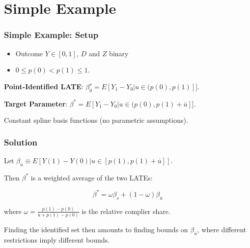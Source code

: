 \documentclass[11pt, aspectratio=169]{beamer}
\begin{document}
\section{Simple Example}

\begin{frame}
    \frametitle{Simple Example: Setup}

    \begin{itemize}
        \item Outcome $Y \in [0,1]$, $D$ and $Z$ binary
        \item $0 \leq p(0) < p(1) \leq 1$.
    \end{itemize}

    \vspace{0.5cm}

    \textbf{Point-Identified LATE}: $\beta_0^s = E[Y_1 - Y_0 | u \in (p(0), p(1)]]$.

    \vspace{0.5cm}

    \textbf{Target Parameter}: $\beta^* = E[Y_1 - Y_0 | u \in (p(0), p(1) + \overline{u}]]$.

    \vspace{0.5cm}

    Constant spline basis functions (no parametric assumptions).

\end{frame}

\begin{frame}
    \frametitle{Solution}

    Let $\beta_{\overline{u}} \equiv E[Y(1) - Y(0) | u \in [p(1), p(1) + \overline{u}]]$.

    \vspace{0.5cm}

    Then $\beta^*$ is a weighted average of the two LATEs:\@

    \begin{equation*}
        \beta^* = \omega\beta_s + (1-\omega)\beta_{\overline{u}}
    \end{equation*}

    where $\omega = \frac{p(1) - p(0)}{\overline{u} + p(1) - p(0)}$ is the relative complier share.

    \vspace{0.5cm}

    Finding the identified set then amounts to finding bounds on $\beta_{\overline{u}}$, where different restrictions imply different bounds.

\end{frame}
\end{document}
